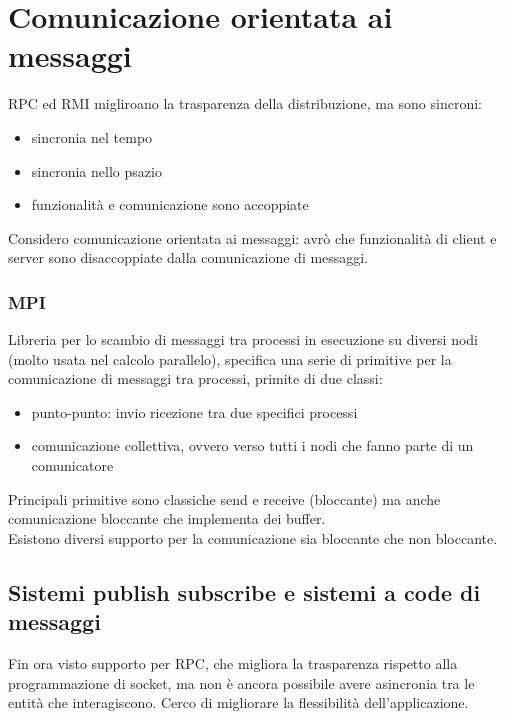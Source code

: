 \documentclass[16px]{article}
\begin{document}
\section{Comunicazione orientata ai messaggi}
RPC ed RMI migliroano la trasparenza della distribuzione, ma sono sincroni:
\begin{itemize}
\item sincronia nel tempo
\item sincronia nello psazio
\item funzionalità e comunicazione sono accoppiate
\end{itemize}
Considero comunicazione orientata ai messaggi: avrò che funzionalità di client e server sono disaccoppiate dalla comunicazione di messaggi.\\
\subsubsection{MPI}
Libreria per lo scambio di messaggi tra processi in esecuzione su diversi nodi (molto usata nel calcolo parallelo), specifica una serie di primitive per la comunicazione di messaggi tra processi, primite di due classi:
\begin{itemize}
\item punto-punto: invio ricezione tra due specifici processi
\item comunicazione collettiva, ovvero verso tutti i nodi che fanno parte di un comunicatore
\end{itemize}
Principali primitive sono classiche send e receive (bloccante) ma anche comunicazione bloccante che implementa dei buffer.\\ Esistono diversi supporto per la comunicazione sia bloccante che non bloccante.
\subsection{Sistemi publish subscribe e sistemi a code di messaggi}
Fin ora visto supporto per RPC, che migliora la trasparenza rispetto alla programmazione di socket, ma non è ancora possibile avere asincronia tra le entità che interagiscono. Cerco di migliorare la flessibilità dell'applicazione.
\end{document}

